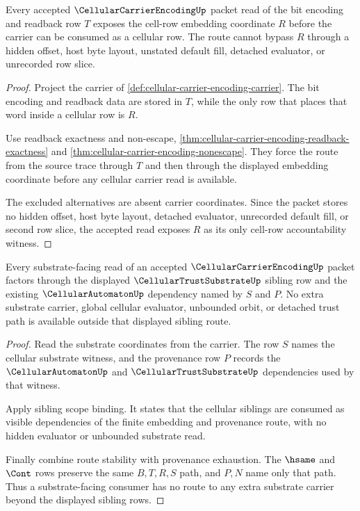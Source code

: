 \begin{theorem}
\label{thm:cellular-carrier-encoding-cell-row-accountability}
Every accepted $\CellularCarrierEncodingUp$ packet read of the bit encoding and readback row $T$ exposes the cell-row embedding coordinate $R$ before the carrier can be consumed as a cellular row. The route cannot bypass $R$ through a hidden offset, host byte layout, unstated default fill, detached evaluator, or unrecorded row slice.
\end{theorem}
\begin{proof}
Project the carrier of \autoref{def:cellular-carrier-encoding-carrier}. The bit encoding and readback data are stored in $T$, while the only row that places that word inside a cellular row is $R$.

Use readback exactness and non-escape, \autoref{thm:cellular-carrier-encoding-readback-exactness} and \autoref{thm:cellular-carrier-encoding-nonescape}. They force the route from the source trace through $T$ and then through the displayed embedding coordinate before any cellular carrier read is available.

The excluded alternatives are absent carrier coordinates. Since the packet stores no hidden offset, host byte layout, detached evaluator, unrecorded default fill, or second row slice, the accepted read exposes $R$ as its only cell-row accountability witness.
\end{proof}

\begin{theorem}
\label{thm:cellular-carrier-encoding-substrate-witness-completeness}
Every substrate-facing read of an accepted $\CellularCarrierEncodingUp$ packet factors through the displayed $\CellularTrustSubstrateUp$ sibling row and the existing $\CellularAutomatonUp$ dependency named by $S$ and $P$. No extra substrate carrier, global cellular evaluator, unbounded orbit, or detached trust path is available outside that displayed sibling route.
\end{theorem}
\begin{proof}
Read the substrate coordinates from the carrier. The row $S$ names the cellular substrate witness, and the provenance row $P$ records the $\CellularAutomatonUp$ and $\CellularTrustSubstrateUp$ dependencies used by that witness.

Apply sibling scope binding. It states that the cellular siblings are consumed as visible dependencies of the finite embedding and provenance route, with no hidden evaluator or unbounded substrate read.

Finally combine route stability with provenance exhaustion. The $\hsame$ and $\Cont$ rows preserve the same $B,T,R,S$ path, and $P,N$ name only that path. Thus a substrate-facing consumer has no route to any extra substrate carrier beyond the displayed sibling rows.
\end{proof}

